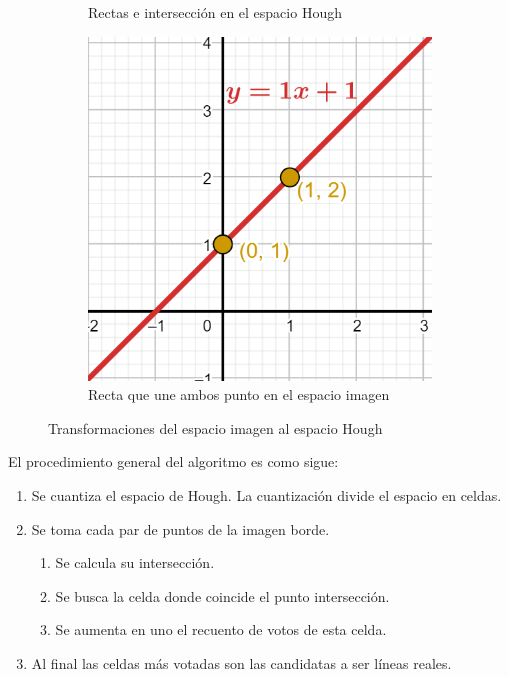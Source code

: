 \begin{figure}
\begin{subfigure}[b]{0.3\textwidth}
        \caption{Rectas e intersección en el espacio Hough}
        \label{fig:hough-intersection}
    \end{subfigure}
    \hfill
    \begin{subfigure}[b]{0.3\textwidth}
        \centering
        \includegraphics[width=\textwidth]{imaxes/c-bases-teoricas/hough-3}
        \caption{Recta que une ambos punto en el espacio imagen}
        \label{fig:hough-recta-a-b}
    \end{subfigure}
    \caption{Transformaciones del espacio imagen al espacio Hough}
    \label{fig:transformaciones-hough}
\end{figure}

El procedimiento general del algoritmo es como sigue:

\begin{enumerate}
    \item Se cuantiza el espacio de Hough. La cuantización divide el espacio en celdas.
    \item Se toma cada par de puntos de la imagen borde.
    \begin{enumerate}
        \item Se calcula su intersección.
        \item Se busca la celda donde coincide el punto intersección.
        \item Se aumenta en uno el recuento de votos de esta celda.
    \end{enumerate}
    \item Al final las celdas más votadas son las candidatas a ser líneas reales.
\end{enumerate}

